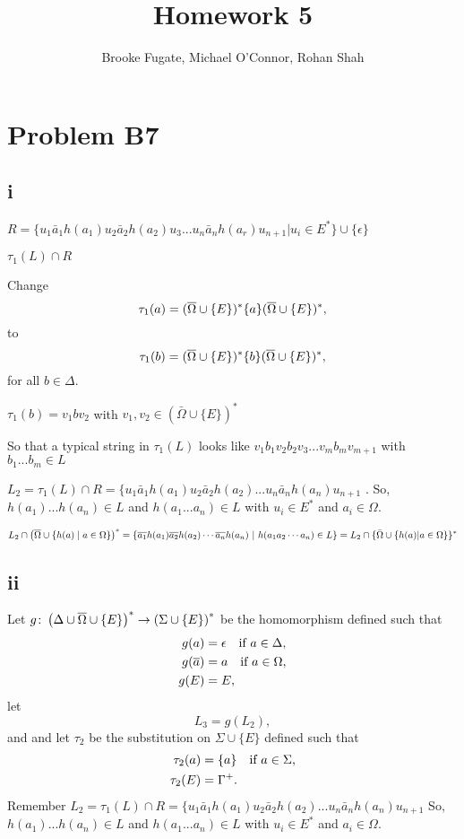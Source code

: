 \documentclass[12pt]{article}
\begin{document}
\pagestyle{plain}
\titleformat{\subsection}[runin]
  {\normalfont\large\bfseries}{\thesubsection}{1em}{}

\title{Homework 5}
\author{Brooke Fugate, Michael O'Connor, Rohan Shah}
\date{}

\maketitle

\section*{Problem B7}
\subsection*{i}
$R = \{u_1 \bar a_1 h(a_1)u_2 \bar a_2h(a_2)u_3...u_n \bar a_nh(a_r)u_{n+1} | u_i \in E^* \} \cup \{\epsilon\}$

$\tau_1(L) \cap R$

Change
$$\tau_1(a) = (\overline{\Omega}\cup\{E\})^*\{a\}(\overline{\Omega}\cup\{E\})^*,$$ to
$$\tau_1(b) = (\overline{\Omega}\cup\{E\})^*\{b\}(\overline{\Omega}\cup\{E\})^*,$$
for all $b\in \Delta$.

$\tau_1(b) = v_1bv_2$ with $v_1,v_2 \in (\bar \Omega \cup \{E\})^*$

So that a typical string in $\tau_1(L)$ looks like $v_1b_1v_2b_2v_3...v_mb_mv_{m+1}$ with $b_1...b_m \in L$

$L_2 = \tau_1(L) \cap R = \{u_1\bar a_1h(a_1)u_2\bar a_2 h(a_2)...u_n \bar a_n h(a_n) u_{n+1}$ . So, $h(a_1)...h(a_n) \in L$ and $h(a_1...a_n) \in L$ with $u_i \in E^*$ and $a_i \in \Omega$.

$$L_2\cap \left(\overline{\Omega}\cup \{h(a) \mid a\in\Omega\}\right)^*
=\{\overline{a_1}h(a_1) \overline{a_2}h(a_2)\cdots \overline{a_n}h(a_n)\ |\
h(a_1a_2\cdots a_n)\in L\}  = L_2 \cap \{\bar \Omega \cup \{h(a) | a \in \Omega 
\}\}^*$$

\subsection*{ii}

Let $g\colon \left(\Delta\cup\overline{\Omega}\cup\{E\}\right)^*\rightarrow \left(\Sigma\cup \{E\}\right)^*$
be the homomorphism defined such that
\begin{align*}
g(a) &= \epsilon\quad \hbox{if $a\in\Delta$},\\
g(\overline{a}) &= a\quad \hbox{if $a\in\Omega$},\\
g(E) &= E,
\end{align*}
let 
\[L_3 = g(L_2),\]
and
and let $\tau_2$ be the substitution on $\Sigma\cup\{E\}$
defined such that
\begin{align*}
\tau_2(a) &= \{a\}\quad \hbox{if $a\in\Sigma$},\\
\tau_2(E) &= \Gamma^+.
\end{align*}
Remember $L_2 = \tau_1(L) \cap R = \{u_1\bar a_1h(a_1)u_2\bar a_2 h(a_2)...u_n \bar a_n h(a_n) u_{n+1}$ So, $h(a_1)...h(a_n) \in L$ and $h(a_1...a_n) \in L$ with $u_i \in E^*$ and $a_i \in \Omega$. 
\end{document}
